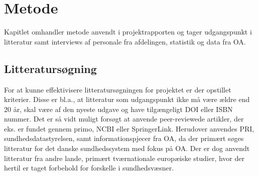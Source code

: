 \chapter{Metode}

Kapitlet omhandler metode anvendt i projektrapporten og tager udgangspunkt i litteratur samt interviews af personale fra afdelingen, statistik og data fra OA. 


\section{Litteratursøgning}
For at kunne effektivisere litteratursøgningen for projektet er der opstillet kriterier. Disse er bl.a., at litteratur som udgangspunkt ikke må være ældre end $20$ år, skal være af den nyeste udgave og have tilgængeligt DOI eller ISBN nummer. 
Det er så vidt muligt forsøgt at anvende peer-reviewede artikler, der eks. er fundet gennem primo, NCBI eller SpringerLink. Herudover anvendes PRI, sundhedsdatastyrelsen, samt informationspjecer fra OA, da der primært søges litteratur for det danske sundhedssystem med fokus på OA. Der er dog anvendt litteratur fra andre lande, primært tværnationale europæiske studier, hvor der hertil er taget forbehold for forskelle i sundhedsvæsner.


